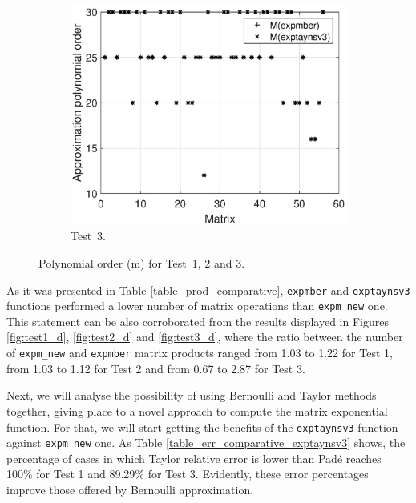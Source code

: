 \begin{figure}[t]
\begin{subfigure}[b]{0.48\textwidth}
\end{subfigure}
\begin{subfigure}[b]{0.48\textwidth}
\includegraphics[scale=0.4]{Figures/polynomial_order_exp_toolbox_n128_nd256-exp_eigtool_n128_nd256_expmber.eps}
\caption{\footnotesize Test~3.}
\label{fig:m_value_test3}
\end{subfigure}
\caption{Polynomial order (m) for Test~1, 2 and 3.}
\label{fig:m_value}
\end{figure}

As it was presented in Table \ref{table_prod_comparative}, \texttt{expmber} and \texttt{exptaynsv3} functions performed a lower number of matrix operations than \texttt{expm\_new} one. This statement can be also corroborated from the results displayed in Figures \ref{fig:test1_d}, \ref{fig:test2_d} and \ref{fig:test3_d}, where the ratio between the number of \texttt{expm\_new} and \texttt{expmber} matrix products ranged from 1.03 to 1.22 for Test 1, from 1.03 to 1.12 for Test 2 and from 0.67 to 2.87 for Test 3.

Next, we will analyse the possibility of using Bernoulli and Taylor methods together, giving place to a novel approach to compute the matrix exponential function. For that, we will start getting the benefits of the \texttt{exptaynsv3} function against \texttt{expm\_new} one.  As Table \ref{table_err_comparative_exptaynsv3} shows, the percentage of cases in which Taylor relative error is lower than Pad\'e reaches 100\% for Test 1 and 89.29\% for Test 3. Evidently, these error percentages improve those offered by Bernoulli approximation. 

